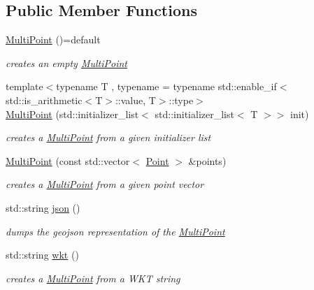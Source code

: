 \subsection*{Public Member Functions}
\begin{DoxyCompactItemize}
\item 
\hyperlink{classsimo_1_1shapes_1_1_multi_point_ad1b9a1a947d02773d9b9cbe18bfdeb12}{Multi\-Point} ()=default
\begin{DoxyCompactList}\small\item\em creates an empty \hyperlink{classsimo_1_1shapes_1_1_multi_point}{Multi\-Point} \end{DoxyCompactList}\item 
{\footnotesize template$<$typename T , typename  = typename std\-::enable\-\_\-if$<$std\-::is\-\_\-arithmetic$<$\-T$>$\-::value, T$>$\-::type$>$ }\\\hyperlink{classsimo_1_1shapes_1_1_multi_point_a5e6cdc0462e2f78395b7c35375ac2afc}{Multi\-Point} (std\-::initializer\-\_\-list$<$ std\-::initializer\-\_\-list$<$ T $>$$>$ init)
\begin{DoxyCompactList}\small\item\em creates a \hyperlink{classsimo_1_1shapes_1_1_multi_point}{Multi\-Point} from a given initializer list \end{DoxyCompactList}\item 
\hyperlink{classsimo_1_1shapes_1_1_multi_point_a894ec2130ac7e5ba82fef72e3b922e0d}{Multi\-Point} (const std\-::vector$<$ \hyperlink{classsimo_1_1shapes_1_1_point}{Point} $>$ \&points)
\begin{DoxyCompactList}\small\item\em creates a \hyperlink{classsimo_1_1shapes_1_1_multi_point}{Multi\-Point} from a given point vector \end{DoxyCompactList}\item 
std\-::string \hyperlink{classsimo_1_1shapes_1_1_multi_point_af802dae29d3887bec0c6bf3687b4b763}{json} ()
\begin{DoxyCompactList}\small\item\em dumps the geojson representation of the \hyperlink{classsimo_1_1shapes_1_1_multi_point}{Multi\-Point} \end{DoxyCompactList}\item 
std\-::string \hyperlink{classsimo_1_1shapes_1_1_multi_point_ae1b037c5687d7629cbb43cfe9700c36a}{wkt} ()
\begin{DoxyCompactList}\small\item\em creates a \hyperlink{classsimo_1_1shapes_1_1_multi_point}{Multi\-Point} from a W\-K\-T string \end{DoxyCompactList}\end{DoxyCompactItemize}

